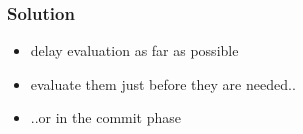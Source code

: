 \documentclass{beamer}
\begin{document}
% 
% 

%   


  \begin{frame}
   \frametitle{Solution}
   \begin{itemize}\setlength\itemsep{1em}
    \item delay evaluation as far as possible
    \item evaluate them just before they are needed..
    \item ..or in the commit phase
   \end{itemize}
  \end{frame}
\end{document}
